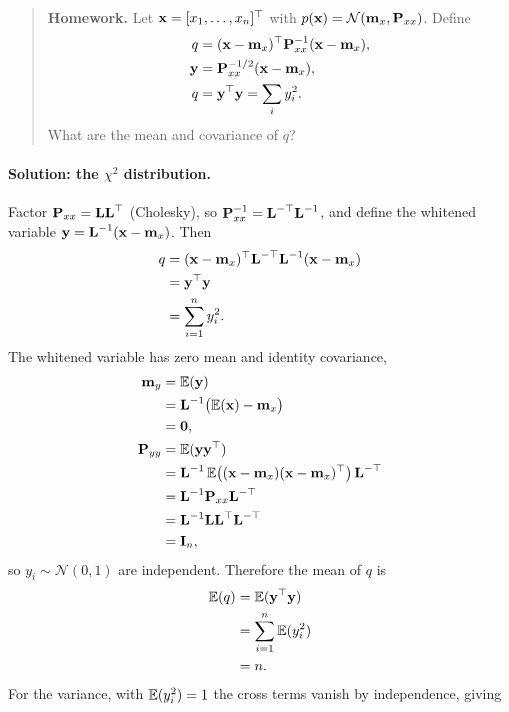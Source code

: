 \begin{quote}
\textbf{Homework.}
Let $\vect{x}=[x_1,\dots,x_n]\trans$ with $p(\vect{x})=\mathcal{N}(\vect{m}_x,\vect{P}_{xx})$. Define
\begin{align*}
q &= (\vect{x}-\vect{m}_x)\trans \vect{P}_{xx}^{-1}(\vect{x}-\vect{m}_x), \\
\vect{y} &= \vect{P}_{xx}^{-1/2}(\vect{x}-\vect{m}_x), \\
q &= \vect{y}\trans\vect{y} = \sum_i y_i^2.
\end{align*}
What are the mean and covariance of $q$?
\end{quote}

\paragraph{Solution: the \texorpdfstring{$\chi^2$}{chi-squared} distribution.}
Factor $\vect{P}_{xx} = \vect{L}\vect{L}\trans$ (Cholesky), so $\vect{P}_{xx}^{-1} = \vect{L}^{-\top}\vect{L}^{-1}$, and define the whitened variable $\vect{y} = \vect{L}^{-1}(\vect{x}-\vect{m}_x)$. Then
\begin{align}
q &= (\vect{x}-\vect{m}_x)\trans \vect{L}^{-\top}\vect{L}^{-1}(\vect{x}-\vect{m}_x) \\
&= \vect{y}\trans\vect{y} \\
&= \sum_{i=1}^n y_i^2.
\end{align}
The whitened variable has zero mean and identity covariance,
\begin{align}
\vect{m}_y &= \E(\vect{y}) \\
&= \vect{L}^{-1}\big(\E(\vect{x}) - \vect{m}_x\big) \\
&= \vect{0}, \\
\vect{P}_{yy} &= \E(\vect{y}\vect{y}\trans) \\
&= \vect{L}^{-1}\,\E\big((\vect{x}-\vect{m}_x)(\vect{x}-\vect{m}_x)\trans\big)\,\vect{L}^{-\top} \\
&= \vect{L}^{-1}\vect{P}_{xx}\vect{L}^{-\top} \\
&= \vect{L}^{-1}\vect{L}\vect{L}\trans\vect{L}^{-\top} \\
&= \vect{I}_n,
\end{align}
so $y_i\sim\mathcal{N}(0,1)$ are independent. Therefore the mean of $q$ is
\begin{align}
\E(q) &= \E(\vect{y}\trans\vect{y}) \\
&= \sum_{i=1}^n \E(y_i^2) \\
&= n.
\end{align}
For the variance, with $\E(y_i^2)=1$ the cross terms vanish by independence, giving
